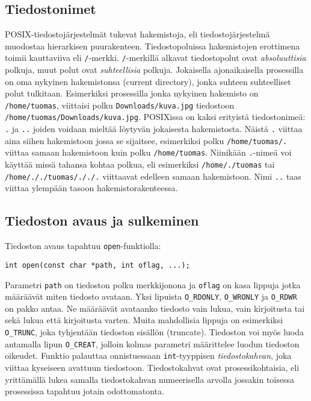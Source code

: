 \subsection{Tiedostonimet}
POSIX-tiedostojärjestelmät tukevat hakemistoja, eli tiedostojärjestelmä muodostaa hierarkisen puurakenteen.
Tiedostopoluissa hakemistojen erottimena toimii kauttaviiva eli \texttt{/}-merkki.
\texttt{/}-merkillä alkavat tiedostopolut ovat \emph{absoluuttisia} polkuja,
muut polut ovat \emph{suhteellisia} polkuja.
Jokaisella ajonaikaisella prosessilla on oma nykyinen hakemistonsa (current directory),
jonka suhteen suhteelliset polut tulkitaan.
Esimerkiksi prosessilla jonka nykyinen hakemisto on \texttt{/home/tuomas},
viittaisi polku \texttt{Downloads/kuva.jpg} tiedostoon \texttt{/home/tuomas/Downloads/kuva.jpg}.
POSIXissa on kaksi erityistä tiedostonimeä: \texttt{.} ja \texttt{..} joiden voidaan mieltää löytyvän jokaisesta hakemistosta.
Näistä \texttt{.} viittaa aina siihen hakemistoon jossa se sijaitsee,
esimerkiksi polku \texttt{/home/tuomas/.} viittaa samaan hakemistoon kuin polku \texttt{/home/tuomas}.
Niinikään \texttt{.}-nimeä voi käyttää missä tahansa kohtaa polkua,
eli esimerkiksi \texttt{/home/./tuomas} tai \texttt{/home/././tuomas/././.} viittaavat edelleen samaan hakemistoon.
Nimi \texttt{..} taas viittaa ylempään tasoon hakemistorakenteessa.

\subsection{Tiedoston avaus ja sulkeminen}
Tiedoston avaus tapahtuu \texttt{open}-funktiolla:

\begin{verbatim}
int open(const char *path, int oflag, ...);
\end{verbatim}

Parametri \texttt{path} on tiedoston polku merkkijonona
ja \texttt{oflag} on kasa lippuja jotka määräävät miten tiedosto avataan.
Yksi lipuista \texttt{O\_RDONLY}, \texttt{O\_WRONLY} ja \texttt{O\_RDWR} on pakko antaa.
Ne määräävät avataanko tiedosto vain lukua, vain kirjoitusta tai sekä lukua että
kirjoitusta varten.
Muita mahdollisia lippuja on esimerkiksi \texttt{O\_TRUNC},
joka tyhjentään tiedoston sisällön (truncate).
Tiedoston voi myös luoda antamalla lipun \texttt{O\_CREAT},
jolloin kolmas parametri määrittelee luodun tiedoston oikeudet.
Funktio palauttaa onnistuessaan \texttt{int}-tyyppisen \emph{tiedostokahvan},
joka viittaa kyseiseen avattuun tiedostoon.
Tiedostokahvat ovat prosessikohtaisia,
eli yrittämällä lukea samalla tiedostokahvan numeerisella arvolla
jossakin toisessa prosessissa tapahtuu jotain odottomatonta.

